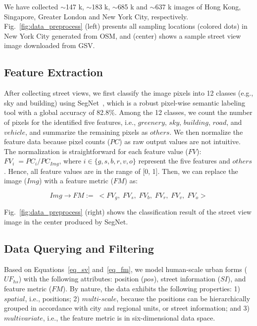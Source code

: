 We have collected $\sim$147 k, $\sim$183 k, $\sim$685 k and $\sim$637 k images of Hong Kong, Singapore, Greater London and New York City, respectively.
Fig.~\ref{fig:data_preprocess} (left) presents all sampling locations (colored dots) in New York City generated from OSM, and (center) shows a sample street view image downloaded from GSV.

\subsection{Feature Extraction}
\label{ssec:feature}
After collecting street views, we first classify the image pixels into 12 classes (e.g., sky and building) using SegNet~\cite{Badrinarayanan_2015_segnet}, which is a robust pixel-wise semantic labeling tool with a global accuracy of 82.8\%.
Among the 12 classes, we count the number of pixels for the identified five features, i.e., $greenery$, $sky$, $building$, $road$, and $vehicle$, and summarize the remaining pixels as $others$.
We then normalize the feature data because pixel counts ($PC$) as raw output values are not intuitive.
The normalization is straightforward for each feature value ($FV$):
$ FV_i \; = {PC_i} / {PC_{Img}} $, where $i \in \{g, s, b, r, v, o\}$ represent the five features and $others$.
Hence, all feature values are in the range of [0, 1].
Then, we can replace the image ($Img$) with a feature metric ($FM$) as:

\vspace*{-2mm}
\begin{equation}
\label{eq_fm}
Img \rightarrow FM := \; <FV_g, \; FV_s, \; FV_b, \; FV_r, \; FV_v, \; FV_o>
\end{equation}

Fig.~\ref{fig:data_preprocess} (right) shows the classification result of the street view image in the center produced by SegNet.

\subsection{Data Querying and Filtering}
\label{ssec:query}

Based on Equations~\ref{eq_sv} and~\ref{eq_fm}, we model human-scale urban forms ($UF_{hs}$) with the following attributes: position ($pos$), street information ($SI$), and feature metric ($FM$).
By nature, the data exhibits the following properties: 
1) $spatial$, i.e., positions;
2) $multi$-$scale$, because the positions can be hierarchically grouped in accordance with city and regional units, or street information;
and 3) $multivariate$, i.e., the feature metric is in six-dimensional data space.

